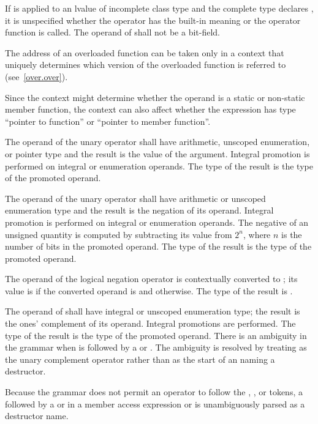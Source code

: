 \pnum
If \tcode{\&} is applied to an lvalue of incomplete class type and the
complete type declares , it is unspecified whether
the operator has the built-in meaning or the operator function is
called. The operand of \tcode{\&} shall not be a bit-field.

\pnum
{}%
The address of an overloaded function can be taken
only in a context that uniquely determines which version of the
overloaded function is referred to (see~\ref{over.over}).
\begin{note}
Since the context might determine whether the operand is a static or
non-static member function, the context can also affect whether the
expression has type ``pointer to function'' or ``pointer to member
function''.
\end{note}

\pnum
{}%
The operand of the unary \tcode{+} operator shall have arithmetic, unscoped
enumeration, or pointer type and the result is the value of the
argument. Integral promotion is performed on integral or enumeration
operands. The type of the result is the type of the promoted operand.

\pnum
{}%
The operand of the unary \tcode{-} operator shall have arithmetic or unscoped
enumeration type and the result is the negation of its operand. Integral
promotion is performed on integral or enumeration operands. The negative
of an unsigned quantity is computed by subtracting its value from $2^n$,
where $n$ is the number of bits in the promoted operand. The type of the
result is the type of the promoted operand.

\pnum
{}%
The operand of the logical negation operator \tcode{!} is contextually
converted to ;
its value is 
if the converted operand is  and  otherwise.
The type of the result is .

\pnum
{}%
%
The operand of \tcode{\~{}} shall have integral or unscoped enumeration type; the
result is the ones' complement of its operand. Integral promotions are
performed. The type of the result is the type of the promoted operand.
There is an ambiguity
in the grammar when \tcode{\~{}} is followed by
a  or .
The ambiguity is resolved by treating \tcode{\~{}} as the unary complement
operator rather than as the start of an 
naming a destructor.
\begin{note}
Because the grammar does not permit an operator to follow the
, \tcode{->}, or \tcode{::} tokens, a \tcode{\~{}} followed by
a  or  in a
member access expression or  is
unambiguously parsed as a destructor name.
\end{note}

